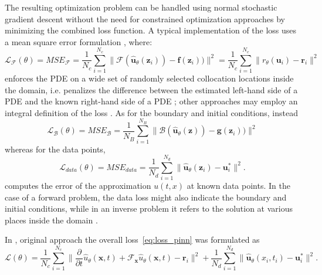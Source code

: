 \documentclass[pdflatex,sn-basic]{sn-jnl}%
\theoremstyle{thmstyleone}%
\theoremstyle{thmstyletwo}%
\theoremstyle{thmstylethree}%
\begin{document}
The resulting optimization problem can be handled using normal stochastic gradient descent without the need for constrained optimization approaches by minimizing the combined loss function.
A typical implementation of the loss uses a mean square error formulation \citep{Kol2021_PhysicsInformedNeural_DAKDJH}, where:
\begin{equation*}
\mathcal{L}_\mathcal{F}(\theta) =  MSE_\mathcal{F} 
= \frac{1}{N_c} \sum_{i=1}^{N_c} \|
\mathcal{F} (\hat{\bm{u}}_\theta(\bm{z}_i))   - \bm{f}(\bm{z}_i))
\|^2    
= \frac{1}{N_c} \sum_{i=1}^{N_c} \|r_{\theta}(\bm{u}_{i}) - \bm{r}_i\|^2
\end{equation*}
enforces the PDE on a wide set of randomly selected collocation locations inside the domain, i.e. penalizes the difference between the estimated left-hand side of a PDE and the known right-hand side of a PDE  \citep{Kol2021_PhysicsInformedNeural_DAKDJH}; %
other approaches may employ an integral definition of the loss \citep{Hen2021_NvidiaSimnetAi_NarHNN}.
As for the boundary and initial conditions, instead 
\begin{equation*}
\mathcal{L}_\mathcal{B}(\theta)  = MSE_\mathcal{B} 
= \frac{1}{N_B} \sum_{i=1}^{N_B} 
\|
\mathcal{B} (\hat{\bm{u}}_\theta(\bm{z}))   - \bm{g}(\bm{z}_i))
\|^2    
\end{equation*}
%
whereas for the data points,
\begin{equation*}
\mathcal{L}_{data}(\theta)  = MSE_{data}  = \frac{1}{N_d}\sum\limits_{i=1}^{N_d}\|\hat{\bm{u}}_{\theta}(\bm{z}_{i}) - \bm{u}_i^*\|^2 .
\end{equation*}
computes the error of the approximation $u(t, x)$ at known data points. In the case of a forward problem, the data loss might also indicate the boundary and initial conditions, while in an inverse problem it refers to the solution at various places inside the domain  \citep{Kol2021_PhysicsInformedNeural_DAKDJH}.


In %
\cite{Rai2018_HiddenPhysicsModels_KarRK, Rai2019_PhysicsInformedNeural_PerRPK}, original approach the overall loss~\eqref{eq:loss_pinn} was formulated as
$$
\mathcal{L}(\theta) =   \frac{1}{N_c} \sum_{i=1}^{N_c} \| \frac{\partial}{\partial t} \hat{u}_{\theta}(\bm{x},t)  + \mathcal{F}_{\bm{x}}\hat{u}_{\theta}(\bm{x},t) - \bm{r}_i\|^2
 +
 \frac{1}{N_d}\sum\limits_{i=1}^{N_d}\|\hat{\bm{u}}_{\theta}(x_{i},t_i) - \bm{u}_i^*\|^2 .
$$
 
\end{document}
